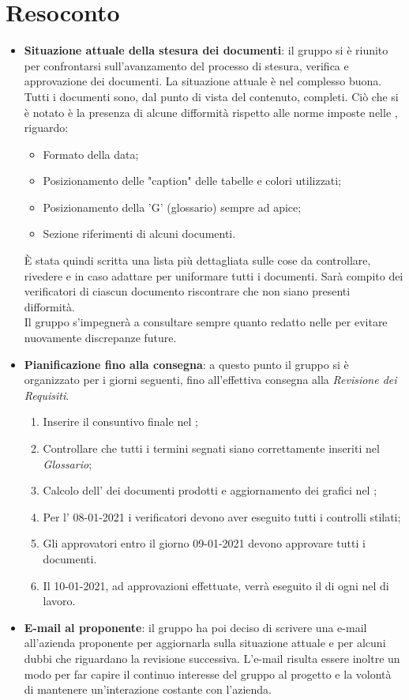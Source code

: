 \section{Resoconto}
\begin{itemize}
\item \textbf{Situazione attuale della stesura dei documenti}: il gruppo si è riunito per confrontarsi sull'avanzamento del processo di stesura, verifica e approvazione dei documenti. La situazione attuale è nel complesso buona. Tutti i documenti sono, dal punto di vista del contenuto, completi. Ciò che si è notato è la presenza di alcune difformità rispetto alle norme imposte nelle \NdPv{}, riguardo:
	\begin{itemize}
		\item Formato della data;
		\item Posizionamento delle "caption" delle tabelle e colori utilizzati;
		\item Posizionamento della 'G' (glossario) sempre ad apice;
		\item Sezione riferimenti di alcuni documenti.
	\end{itemize} 
È stata quindi scritta una lista più dettagliata sulle cose da controllare, rivedere e in caso adattare per uniformare tutti i documenti. Sarà compito dei verificatori di ciascun documento riscontrare che non siano presenti difformità. \\
Il gruppo s'impegnerà a consultare sempre quanto redatto nelle \NdPv{} per evitare nuovamente discrepanze future.

\item \textbf{Pianificazione fino alla consegna}: a questo punto il gruppo si è organizzato per i giorni seguenti, fino all'effettiva consegna alla \textit{Revisione dei Requisiti}. 
	\begin{enumerate}
		\item Inserire il consuntivo finale nel \PdPv{};
		\item Controllare che tutti i termini segnati siano correttamente inseriti nel \textit{Glossario};
		\item Calcolo dell' dei documenti prodotti e aggiornamento dei grafici nel \PdQv{};
		\item Per l' 08-01-2021 i verificatori devono aver eseguito tutti i controlli stilati;
		\item Gli approvatori entro il giorno 09-01-2021 devono approvare tutti i documenti.
		\item Il 10-01-2021, ad approvazioni effettuate, verrà eseguito il  di ogni  nel  di lavoro.
	\end{enumerate}
	
\item \textbf{E-mail al proponente}: il gruppo ha poi deciso di scrivere una e-mail all'azienda proponente per aggiornarla sulla situazione attuale e per alcuni dubbi che riguardano la revisione successiva. L'e-mail risulta essere inoltre un modo per far capire il continuo interesse del gruppo al progetto e la volontà di mantenere un'interazione costante con l'azienda.
\end{itemize}
\newpage